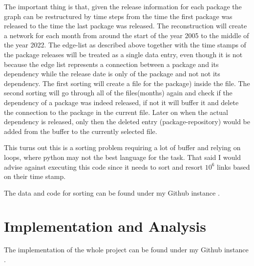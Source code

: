 \documentclass[a4paper]{article}
\begin{document}
The important thing is that, given the release information for each package
the graph can be restructured by time steps from the time the first package
was released to the time the last package was released. The reconstruction
will create a network for each month from around the start of the year 2005
to the middle of the year 2022. The edge-list as described above together
with the time stamps of the package releases will be treated as a single data
entry, even though it is not because the edge list represents a connection
between a package and its dependency while the release date is only of the
package and not not its dependency. The first sorting will create a file for
the package) inside the file. The second sorting will go through all of the
files(months) again and check if the dependency of a package was indeed
released, if not it will buffer it and delete the connection to the package
in the current file. Later on when the actual dependency is released, only
then the deleted entry (package-repository) would be added from the buffer to
the currently selected file.

This turns out this is a sorting problem requiring a lot of buffer and
relying on loops, where python may not the best language for the task. That
said I would advise against executing this code since it needs to sort and
resort $10^{6}$ links based on their time stamp.

The data and code for sorting can be found under my Github instance
\cite{sorting}.

\section{Implementation and Analysis}
The implementation of the whole project can be found under my Github instance
\cite{impl}.
\end{document}
